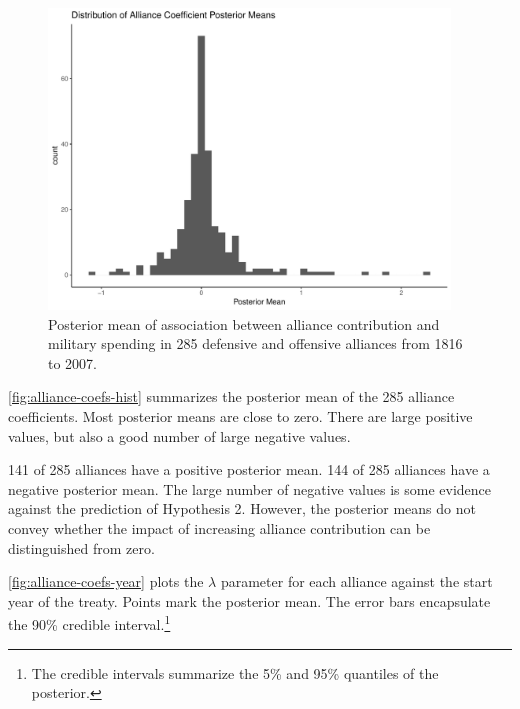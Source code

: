\documentclass[12pt]{article}
\begin{document}
\begin{figure}[htbp]
	\centering
		\includegraphics[width=0.95\textwidth]{alliance-coefs-hist.pdf}
	\caption{Posterior mean of association between alliance contribution and military spending in 285 defensive and offensive alliances from 1816 to 2007.}
	\label{fig:alliance-coefs-hist}
\end{figure}


\autoref{fig:alliance-coefs-hist} summarizes the posterior mean of the 285 alliance coefficients. 
Most posterior means are close to zero. 
There are large positive values, but also a good number of large negative values.


141 of 285 alliances have a positive posterior mean. 
144 of 285 alliances have a negative posterior mean. 
The large number of negative values is some evidence against the prediction of Hypothesis 2. 
However, the posterior means do not convey whether the impact of increasing alliance contribution can be distinguished from zero. 


\autoref{fig:alliance-coefs-year} plots the $\lambda$ parameter for each alliance against the start year of the treaty.
Points mark the posterior mean. 
The error bars encapsulate the 90\% credible interval.\footnote{The credible intervals summarize the 5\% and 95\% quantiles of the posterior.}  
\end{document}
